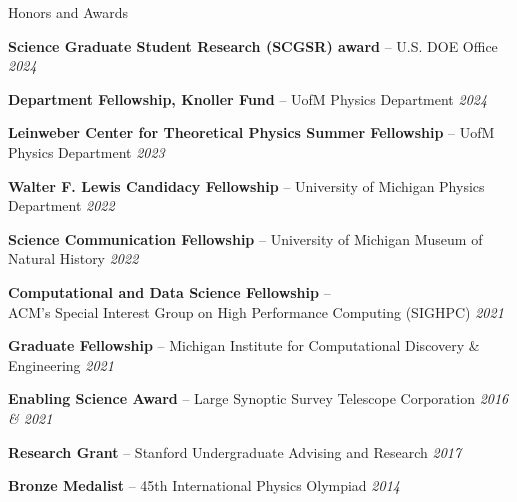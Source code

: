 \documentclass{resume} %
\begin{document}
\begin{rSection}{Honors and Awards} \itemsep -3pt \vspace*{-.25cm}

\item \textbf{Science Graduate Student Research (SCGSR) award} -- U.S. DOE Office \hfill{\em 2024}

\item \textbf{Department Fellowship, Knoller Fund} -- UofM Physics Department \hfill{\em 2024}

\item \textbf{Leinweber Center for Theoretical Physics Summer Fellowship} -- UofM Physics Department \hfill{\em 2023}

\item \textbf{Walter F. Lewis Candidacy Fellowship} -- University of Michigan Physics Department \hfill{\em 2022}

\item \textbf{Science Communication Fellowship} -- University of Michigan Museum of Natural History \hfill{\em 2022}

\item \textbf{Computational and Data Science Fellowship} -- \\ ACM’s Special Interest Group on High Performance Computing (SIGHPC) \hfill {\em 2021}

\item \textbf{Graduate Fellowship} -- Michigan Institute for Computational Discovery \& Engineering  \hfill {\em 2021}

\item \textbf{Enabling Science Award} -- Large Synoptic Survey Telescope Corporation \hfill {\em 2016 \& 2021}

\item \textbf{Research Grant} -- Stanford Undergraduate Advising and Research \hfill {\em 2017}

\item \textbf{Bronze Medalist} -- 45th International Physics Olympiad \hfill {\em 2014}
\end{rSection}
\end{document}
